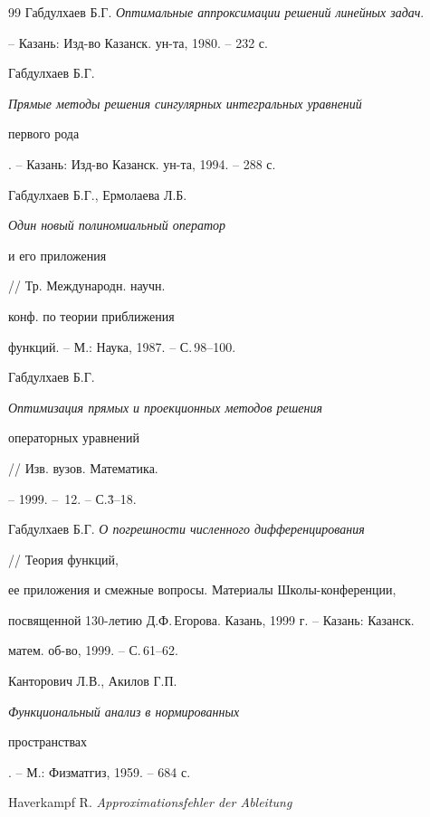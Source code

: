 \begin{thebibliography}{99}
Габдулхаев Б.Г. {\em Оптимальные аппроксимации решений линейных задач}.


-- Казань: Изд-во Казанск. ун-та, 1980. -- 232 с.







Габдулхаев Б.Г. {\em Прямые методы решения сингулярных интегральных уравнений


первого рода}. -- Казань: Изд-во Казанск. ун-та, 1994. -- 288 с.







Габдулхаев Б.Г., Ермолаева Л.Б. {\em Один новый полиномиальный оператор


и его приложения} // Тр. Международн. научн.


конф. по теории приближения


функций. -- М.: Наука, 1987. -- С.\,98--100.







Габдулхаев Б.Г. {\em Оптимизация прямых и проекционных методов решения 


операторных уравнений} // Изв. вузов. Математика.


-- 1999. -- \No\,12. -- С.\.3--18.







Габдулхаев Б.Г. {\em О погрешности численного дифференцирования}


// Теория функций,


ее приложения и смежные вопросы. Материалы Школы-конференции,


посвященной 130-летию Д.Ф.\,Егорова. Казань, 1999 г. -- Казань: Казанск.


матем. об-во, 1999. -- С.\,61--62.







Канторович Л.В., Акилов Г.П. {\em Функциональный анализ в нормированных


пространствах}. -- М.: Физматгиз, 1959. -- 684 с.







Haverkampf R. {\em Approximationsfehler der Ableitung}



\end{thebibliography}
